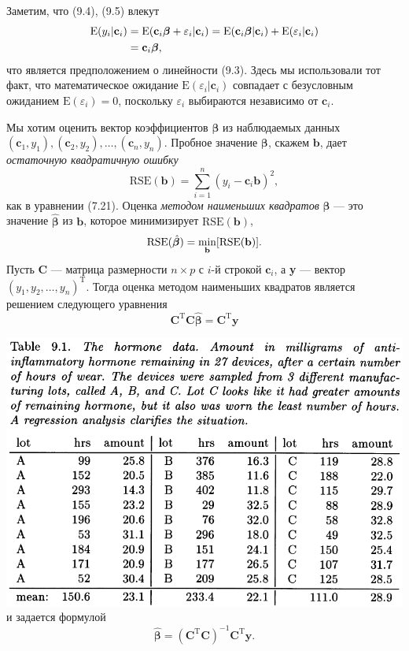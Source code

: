 Заметим, что (9.4), (9.5) влекут
\begin{align}
	\text{E}(y_i|\textbf{c}_i) & = \text{E}(\textbf{c}_i \bm{\beta}+\varepsilon_i|\textbf{c}_i) = \text{E}(\textbf{c}_i \bm{\beta}|\textbf{c}_i) + \text{E}(\varepsilon_i|\textbf{c}_i) \notag \\
	& = \textbf{c}_i \bm{\beta},
\end{align}
что является предположением о линейности (9.3). Здесь мы использовали тот факт, что математическое ожидание $\text{E}(\varepsilon_i|\textbf{c}_i)$ совпадает с безусловным ожиданием $\text{E}(\varepsilon_i) = 0$, поскольку $\varepsilon_i$ выбираются независимо от $\textbf{c}_i$.

Мы хотим оценить вектор коэффициентов $\bm{\beta}$ из наблюдаемых данных $(\textbf{c}_1, y_1), (\textbf{c}_2, y_2), \ldots, (\textbf{c}_n, y_n)$. Пробное значение $\bm{\beta}$, скажем $\textbf{b}$, дает \textit{остаточную квадратичную ошибку}
\begin{equation}
	\text{RSE}(\textbf{b}) = \sum\limits_{i=1}^{n} (y_i - \textbf{c}_i \textbf{b})^2,
\end{equation}
как в уравнении (7.21). Оценка \textit{методом наименьших квадратов} $\bm{\beta}$ --- это значение $\hat{\bm{\beta}}$ из $\textbf{b}$, которое минимизирует $\text{RSE}(\textbf{b})$,
\begin{equation}
	\text{RSE}(\hat{\bm{\beta}}) = \min_{\textbf{b}} [\text{RSE(\textbf{b})}].
\end{equation}
Пусть $\textbf{C}$ --- матрица размерности $n \times p$ с $i$-й строкой $\textbf{c}_i$, а \textbf{y} --- вектор $(y_1, y_2, \ldots, y_n)^\text{T}$. Тогда оценка методом наименьших квадратов является решением следующего уравнения
\begin{equation}
	\textbf{C}^\text{T} \textbf{C} \hat{\bm{\beta}} = \textbf{C}^\text{T} \textbf{y}
\end{equation}

\noindent
\noindent\includegraphics[width=\linewidth]{9/t91}
\newline
и задается формулой
\begin{equation}
	\hat{\bm{\beta}} = (\textbf{C}^\text{T} \textbf{C})^{-1} \textbf{C}^\text{T} \textbf{y}.
\end{equation}